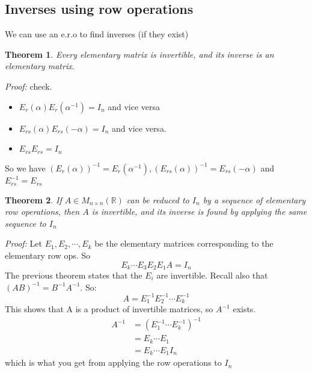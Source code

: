 \documentclass{report}
\newtheorem{theorem}{Theorem}[subsection]
\theoremstyle{remark}
\theoremstyle{definition}
\theoremstyle{definition}
\theoremstyle{theorem}
\begin{document}
\subsection{Inverses using row operations}
We can use an e.r.o to find inverses (if they exist)
\begin{theorem}
Every elementary matrix is invertible, and its inverse is an elementary matrix.
\end{theorem}
\emph{Proof:} check.
\begin{itemize}
    \item $E_r(\alpha)E_r(\alpha^{-1}) = I_n$ and vice versa
    \item $E_{rs}(\alpha)E_{rs}(-\alpha)=I_n$ and vice versa.
    \item $E_{rs}E_{rs} = I_n$
\end{itemize}
So we have $(E_r(\alpha))^{-1} = E_r(\alpha^{-1}), (E_{rs}(\alpha))^{-1} = E_{rs}(-\alpha)$ and $E_{rs}^{-1}=E_{rs}$
\begin{theorem}
If $A \in M_{n \times n}(\mathbb{R})$ can be reduced to $I_n$ by a sequence of elementary row operations, then $A$ is invertible, and its inverse is found by applying the same sequence to $I_n$ 
\end{theorem}
\emph{Proof:} Let $E_1, E_2, \cdots, E_k$ be the elementary matrices corresponding to the elementary row ops. So
\[E_k \cdots E_3E_2E_1A= I_n\]
The previous theorem states that the $E_i$ are invertible. Recall also that $(AB)^{-1} = B^{-1}A^{-1}$. So:
\[A=E_1^{-1}E_2^{-1}\cdots E_k^{-1}\]
This shows that A is a product of invertible matrices, so $A^{-1}$ exists.
\begin{align*}
    A^{-1} &= (E_1^{-1} \cdots E_k^{-1})^{-1}\\
    &=E_k \cdots E_1\\
    &= E_k\cdots E_1 I_n
\end{align*}
which is what you get from applying the row operations to $I_n$
\end{document}
